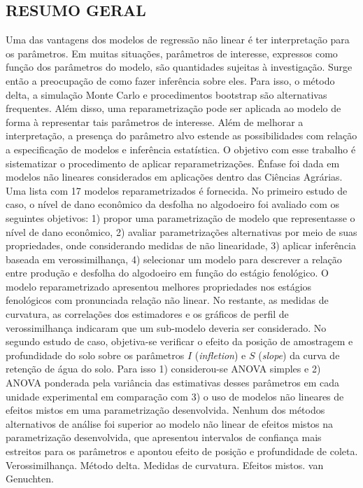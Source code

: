
\begin{singlespace}
\begin{center}
\section*{RESUMO GERAL}
\end{center}

Uma das vantagens dos modelos de regressão não linear é ter
interpretação para os parâmetros. Em muitas situações, parâmetros de
interesse, expressos como função dos parâmetros do modelo, são
quantidades sujeitas à investigação. Surge então a preocupação de como
fazer inferência sobre eles. Para isso, o método delta, a simulação
Monte Carlo e procedimentos bootstrap são alternativas
frequentes. Além disso, uma reparametrização pode ser aplicada ao
modelo de forma à representar tais parâmetros de interesse. Além de
melhorar a interpretação, a presença do parâmetro alvo estende as
possibilidades com relação a especificação de modelos e inferência
estatística. O objetivo com esse trabalho é sistematizar o
procedimento de aplicar reparametrizações. Ênfase foi dada em modelos
não lineares considerados em aplicações dentro das Ciências
Agrárias. Uma lista com 17 modelos reparametrizados é fornecida. No
primeiro estudo de caso, o nível de dano econômico da desfolha no
algodoeiro foi avaliado com os seguintes objetivos: 1) propor uma
parametrização de modelo que representasse o nível de dano econômico,
2) avaliar parametrizações alternativas por meio de suas propriedades,
onde considerando medidas de não linearidade, 3) aplicar inferência
baseada em verossimilhança, 4) selecionar um modelo para descrever a
relação entre produção e desfolha do algodoeiro em função do estágio
fenológico. O modelo reparametrizado apresentou melhores propriedades
nos estágios fenológicos com pronunciada relação não linear. No
restante, as medidas de curvatura, as correlações dos estimadores e os
gráficos de perfil de verossimilhança indicaram que um sub-modelo
deveria ser considerado. No segundo estudo de caso, objetiva-se
verificar o efeito da posição de amostragem e profundidade do solo
sobre os parâmetros $I$ (\emph{infletion}) e $S$ (\emph{slope}) da
curva de retenção de água do solo. Para isso 1) considerou-se ANOVA
simples e 2) ANOVA ponderada pela variância das estimativas desses
parâmetros em cada unidade experimental em comparação com 3) o uso de
modelos não lineares de efeitos mistos em uma parametrização
desenvolvida. Nenhum dos métodos alternativos de análise foi superior
ao modelo não linear de efeitos mistos na parametrização desenvolvida,
que apresentou intervalos de confiança mais estreitos para os
parâmetros e apontou efeito de posição e profundidade de coleta.\\
\newline
{} Verossimilhança. Método delta. Medidas de
curvatura. Efeitos mistos. van Genuchten.
\end{singlespace}

